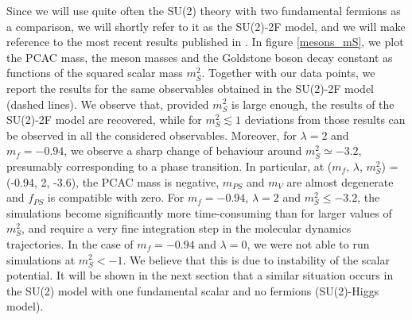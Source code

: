 Since we will use quite often the SU(2) theory with two fundamental fermions as a comparison, we will shortly refer to it as the SU(2)-2F model, and we will make reference to the most recent results published in \cite{Arthur:2016dir}.
In figure \ref{mesons_mS}, we plot the PCAC mass, the meson masses and the Goldstone boson decay constant as functions of the squared scalar mass $m_S^2$. Together with our data points, we report the results for the same observables obtained in the SU(2)-2F model (dashed lines).  We observe that, provided $m_S^2$ is large enough, the results of the SU(2)-2F model are recovered, while for $m_S^2 \lesssim 1$ deviations from those results can be observed in all the considered observables. Moreover, for $\lambda = 2$ and $m_f = -0.94$, we observe a sharp change of behaviour around $m_S^2 \simeq -3.2$, presumably corresponding to a phase transition. In particular, at ($m_f$, $\lambda$, $m_S^2$) = (-0.94, 2, -3.6), the PCAC mass is negative, $m_{PS}$ and $m_V$ are almost degenerate and $f_{PS}$ is compatible with zero. For $m_f = -0.94$, $\lambda = 2$ and $m_S^2 \leq -3.2$, the simulations become significantly more time-consuming than for larger values of $m_S^2$, and require a very fine integration step in the molecular dynamics trajectories. In the case of $m_f = -0.94$ and $\lambda = 0$, we were not able to run simulations at $m_S^2 < -1$. We believe that this is due to instability of the scalar potential. It will be shown in the next section that a similar situation occurs in the SU(2) model with one fundamental scalar and no fermions (SU(2)-Higgs model).



